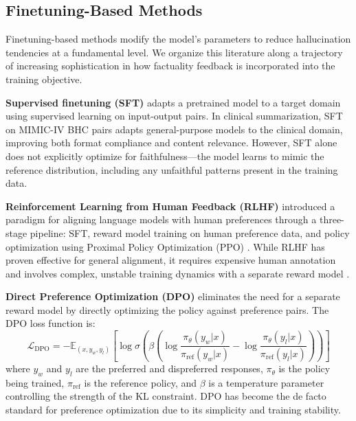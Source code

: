 \documentclass[12pt,a4paper,oneside]{report}
\begin{document}
\subsection{Finetuning-Based Methods}
\label{subsec:finetuning-methods}

Finetuning-based methods modify the model's parameters to reduce hallucination tendencies at a fundamental level. We organize this literature along a trajectory of increasing sophistication in how factuality feedback is incorporated into the training objective.

\textbf{Supervised finetuning (SFT)} adapts a pretrained model to a target domain using supervised learning on input-output pairs. In clinical summarization, SFT on MIMIC-IV BHC pairs adapts general-purpose models to the clinical domain, improving both format compliance and content relevance. However, SFT alone does not explicitly optimize for faithfulness---the model learns to mimic the reference distribution, including any unfaithful patterns present in the training data.

\textbf{Reinforcement Learning from Human Feedback (RLHF)} \cite{ouyang2022instructgpt} introduced a paradigm for aligning language models with human preferences through a three-stage pipeline: SFT, reward model training on human preference data, and policy optimization using Proximal Policy Optimization (PPO) \cite{schulman2017ppo}. While RLHF has proven effective for general alignment, it requires expensive human annotation and involves complex, unstable training dynamics with a separate reward model \cite{bai2022constitutional}.

\textbf{Direct Preference Optimization (DPO)} \cite{rafailov2023dpo} eliminates the need for a separate reward model by directly optimizing the policy against preference pairs. The DPO loss function is:
\begin{equation}
\mathcal{L}_{\text{DPO}} = -\mathbb{E}_{(x, y_w, y_l)}\left[\log \sigma\left(\beta \left(\log \frac{\pi_\theta(y_w|x)}{\pi_{\text{ref}}(y_w|x)} - \log \frac{\pi_\theta(y_l|x)}{\pi_{\text{ref}}(y_l|x)}\right)\right)\right]
\label{eq:dpo}
\end{equation}
where $y_w$ and $y_l$ are the preferred and dispreferred responses, $\pi_\theta$ is the policy being trained, $\pi_{\text{ref}}$ is the reference policy, and $\beta$ is a temperature parameter controlling the strength of the KL constraint. DPO has become the de facto standard for preference optimization due to its simplicity and training stability.
\end{document}
